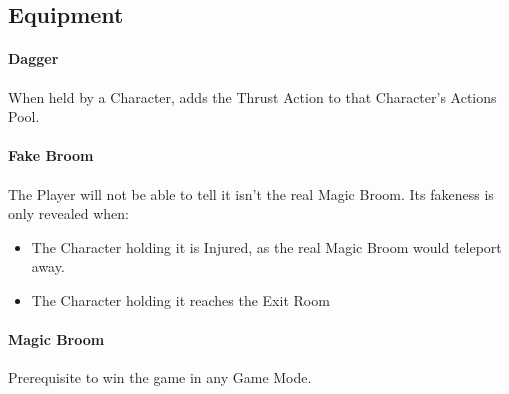 \subsection{Equipment}


\paragraph{Dagger} When held by a Character, adds the Thrust Action to that Character's Actions Pool.

\paragraph{Fake Broom} The Player will not be able to tell it isn't the real Magic Broom. Its fakeness is only revealed when:

\begin{itemize}
	\item The Character holding it is Injured, as the real Magic Broom would teleport away.
	\item The Character holding it reaches the Exit Room
\end{itemize}

\paragraph{Magic Broom} Prerequisite to win the game in any Game Mode.